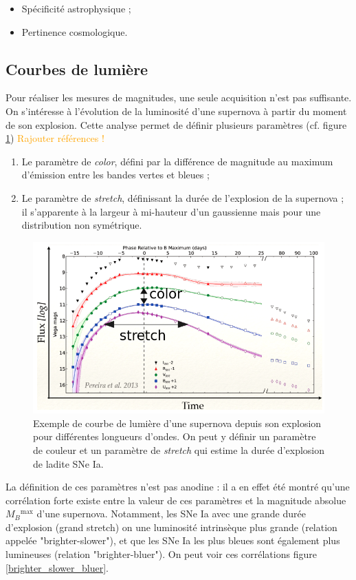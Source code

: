 \documentclass[a4paper, 12pt, svgnames]{article}
\begin{document}
\begin{itemize}
    \item Spécificité astrophysique ;
    \item Pertinence cosmologique.
\end{itemize}

\subsection{Courbes de lumière}
Pour réaliser les mesures de magnitudes, une seule acquisition n'est pas
suffisante. On s'intéresse à l'évolution de la luminosité d'une supernova à
partir du moment de son explosion. Cette analyse permet de définir plusieurs
paramètres (cf. figure \ref{lightcurves}) \textcolor{orange}{Rajouter
références !}

\begin{enumerate}
    \item Le paramètre de \textit{color}, défini par la différence de magnitude
        au maximum d'émission entre les bandes vertes et bleues ;
    \item Le paramètre de \textit{stretch}, définissant la durée de l'explosion
        de la supernova ; il s'apparente à la largeur à mi-hauteur d'un
        gaussienne mais pour une distribution non symétrique.
\end{enumerate}

\begin{figure}[htbp!]
    \centering
    \includegraphics[width=.5\linewidth]{Rapport_figures/Lightcurves.png}
    \caption{Exemple de courbe de lumière d'une supernova depuis son explosion
    pour différentes longueurs d'ondes. On peut y définir un paramètre de
couleur et un paramètre de \textit{stretch} qui estime la durée d'explosion de
ladite SNe Ia.}
    \captionsetup{justification=centering}
    \label{lightcurves}
\end{figure}

La définition de ces paramètres n'est pas anodine : il a en effet été montré
qu'une corrélation forte existe entre la valeur de ces paramètres et la
magnitude absolue $M_B{}^{\text{max}}$ d'une supernova. Notamment, les SNe Ia
avec une grande durée d'explosion (grand stretch) on une luminosité intrinsèque
plus grande (relation appelée "brighter-slower"), et que les SNe Ia les plus
bleues sont également plus lumineuses (relation "brighter-bluer"). On peut voir
ces corrélations figure \ref{brighter_slower_bluer}.
\end{document}
